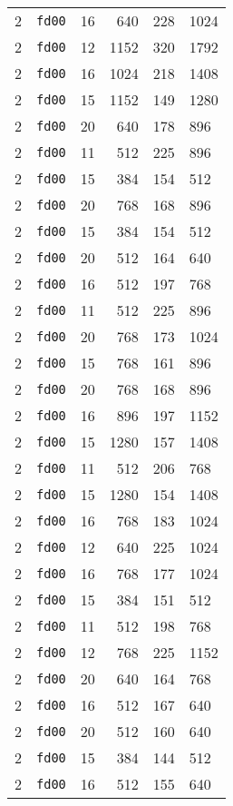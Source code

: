 \documentclass{article}
\begin{document}
\begin{table}[h!]
\begin{tabular}{llrrrl}
    2 & \texttt{fd00} & 16 & 640 & 228 & 1024 \\
    2 & \texttt{fd00} & 12 & 1152 & 320 & 1792 \\
    2 & \texttt{fd00} & 16 & 1024 & 218 & 1408 \\
    2 & \texttt{fd00} & 15 & 1152 & 149 & 1280 \\
    2 & \texttt{fd00} & 20 & 640 & 178 & 896 \\
    2 & \texttt{fd00} & 11 & 512 & 225 & 896 \\
    2 & \texttt{fd00} & 15 & 384 & 154 & 512 \\
    2 & \texttt{fd00} & 20 & 768 & 168 & 896 \\
    2 & \texttt{fd00} & 15 & 384 & 154 & 512 \\
    2 & \texttt{fd00} & 20 & 512 & 164 & 640 \\
    2 & \texttt{fd00} & 16 & 512 & 197 & 768 \\
    2 & \texttt{fd00} & 11 & 512 & 225 & 896 \\
    2 & \texttt{fd00} & 20 & 768 & 173 & 1024 \\
    2 & \texttt{fd00} & 15 & 768 & 161 & 896 \\
    2 & \texttt{fd00} & 20 & 768 & 168 & 896 \\
    2 & \texttt{fd00} & 16 & 896 & 197 & 1152 \\
    2 & \texttt{fd00} & 15 & 1280 & 157 & 1408 \\
    2 & \texttt{fd00} & 11 & 512 & 206 & 768 \\
    2 & \texttt{fd00} & 15 & 1280 & 154 & 1408 \\
    2 & \texttt{fd00} & 16 & 768 & 183 & 1024 \\
    2 & \texttt{fd00} & 12 & 640 & 225 & 1024 \\
    2 & \texttt{fd00} & 16 & 768 & 177 & 1024 \\
    2 & \texttt{fd00} & 15 & 384 & 151 & 512 \\
    2 & \texttt{fd00} & 11 & 512 & 198 & 768 \\
    2 & \texttt{fd00} & 12 & 768 & 225 & 1152 \\
    2 & \texttt{fd00} & 20 & 640 & 164 & 768 \\
    2 & \texttt{fd00} & 16 & 512 & 167 & 640 \\
    2 & \texttt{fd00} & 20 & 512 & 160 & 640 \\
    2 & \texttt{fd00} & 15 & 384 & 144 & 512 \\
    2 & \texttt{fd00} & 16 & 512 & 155 & 640 \\

\end{tabular}
\end{table}
\end{document}
